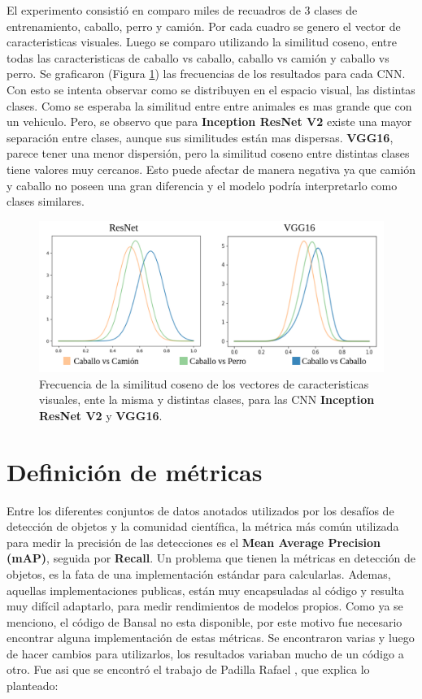 El experimento consistió en comparo miles de recuadros de 3 clases de entrenamiento, caballo, perro y camión.  Por cada cuadro se genero el vector de caracteristicas visuales. Luego se comparo utilizando la similitud coseno, entre todas las caracteristicas de caballo vs caballo, caballo vs camión y caballo vs perro. Se graficaron (Figura \ref{fig:vgg-vs-resnet}) las frecuencias de los resultados para cada CNN. Con esto se intenta observar como se distribuyen en el espacio visual, las distintas clases. Como se esperaba la similitud entre entre animales es mas grande que con un vehiculo. Pero, se observo que para \textbf{Inception ResNet V2} existe una mayor separación entre clases, aunque sus similitudes están mas dispersas. \textbf{VGG16}, parece tener una menor dispersión, pero la similitud coseno entre distintas clases tiene valores muy cercanos. Esto puede afectar de manera negativa ya que camión y caballo no poseen una gran diferencia y el modelo podría interpretarlo como clases similares.\\

\begin{figure}
	\centering
	\includegraphics[width=1\linewidth]{img/vgg-vs-resnet}
	\caption{Frecuencia de la similitud coseno de los vectores de caracteristicas visuales, ente la misma y distintas clases, para las CNN  \textbf{Inception ResNet V2} y \textbf{VGG16}.}
	\label{fig:vgg-vs-resnet}
\end{figure}

\section{Definición de métricas}
Entre los diferentes conjuntos de datos anotados utilizados por los desafíos de detección de objetos y la comunidad científica, la métrica más común utilizada para medir la precisión de las detecciones es el  \textbf{Mean Average Precision (mAP)}, seguida por \textbf{Recall}. Un problema que tienen la métricas en detección de objetos, es la fata de una implementación estándar para calcularlas. Ademas, aquellas implementaciones publicas, están muy encapsuladas al código y resulta muy difícil adaptarlo, para medir rendimientos de modelos propios. Como ya se menciono, el código de Bansal \cite{bansal2018zero} no esta disponible, por este motivo fue necesario encontrar alguna implementación de estas métricas. Se encontraron varias y luego de hacer cambios para utilizarlos, los resultados variaban mucho de un código a otro.
Fue asi que se encontró el trabajo de Padilla Rafael \cite{padilla2020survey}, que explica lo planteado:\\

